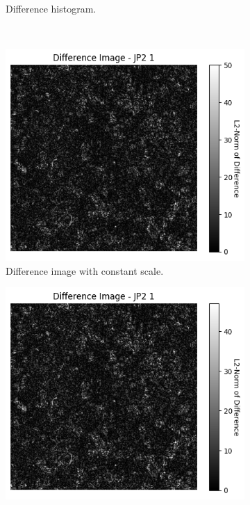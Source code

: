 \begin{figure}[htb]
\begin{subfigure}[b]{0.48\textwidth}
        \caption{Difference histogram.}
        \label{fig:img_quality_comp_jp2_1_center_histo}
    \end{subfigure}
    \\
    \begin{subfigure}[b]{0.48\textwidth}
        \centering
        \includegraphics[width=\textwidth]{doc/thesis/0_figures/compare_quality/set1/jp2_1_center_diff_heatmap.png}
        \caption{Difference image with constant scale.}
        \label{fig:img_quality_comp_jp2_1_center_diff}
    \end{subfigure}
    \begin{subfigure}[b]{0.48\textwidth}
        \centering
        \includegraphics[width=\textwidth]{doc/thesis/0_figures/compare_quality/set1/jp2_1_center_diff_heatmap_rel.png}

\end{subfigure}
\end{figure}
